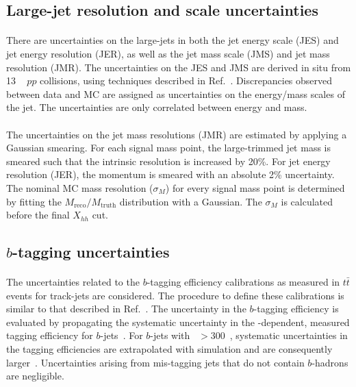 \subsection{Large-\R jet resolution and scale uncertainties} 
\paragraph{}
There are uncertainties on the large-\R jets in both the jet energy scale (JES) and jet energy resolution (JER), as well as the jet mass scale (JMS) and jet mass resolution (JMR).
The uncertainties on the JES and JMS are derived in situ from 13 \TeV~ $pp$ collisions, using techniques described in Ref.~\cite{JetMassAndSubstructure}. 
Discrepancies observed between data and MC are assigned as uncertainties on the energy/mass scales of the jet.
The uncertainties are only correlated between energy and mass.

\paragraph{}
The uncertainties on the jet mass resolutions (JMR) are estimated by applying a Gaussian smearing.
For each signal mass point, the large-\R trimmed jet mass is smeared such that the intrinsic resolution is increased by 20\%. 
For jet energy resolution (JER), the momentum is smeared with an absolute 2\% uncertainty. 
The nominal MC mass resolution ($\sigma_{M}$) for every signal mass point is determined by fitting the $M_\text{reco} / M_\text{truth}$ distribution with a Gaussian. 
The $\sigma_{M}$ is calculated before the final $X_{hh}$ cut.


\subsection{$b$-tagging uncertainties}
\label{sec:b-tagging-unc}

\paragraph{}
The uncertainties related to the $b$-tagging efficiency calibrations as measured in $t\bar{t}$ events for track-jets are considered. 
The procedure to define these calibrations is similar to that described in Ref.~\cite{Aad:2015ydr}. 
The uncertainty in the $b$-tagging efficiency is evaluated by propagating the systematic uncertainty in the \pt-dependent, measured tagging efficiency for $b$-jets~\cite{ATLAS-CONF-2014-004}. 
For $b$-jets with \pt~$> 300$~\GeV, systematic uncertainties in the tagging efficiencies are extrapolated with simulation and are consequently larger~\cite{Aad:2015ydr}. 
Uncertainties arising from mis-tagging jets that do not contain $b$-hadrons are negligible.

